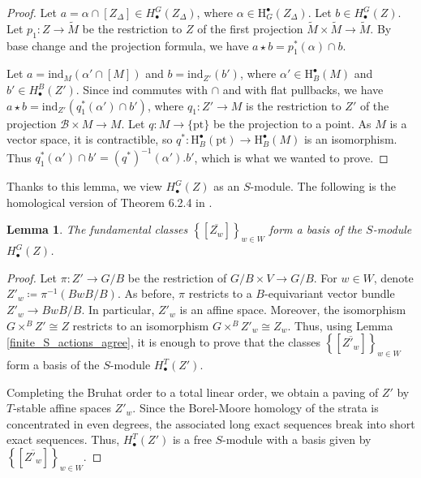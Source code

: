\documentclass[11pt]{article}
\newcommand{\B}{\mathcal{B}}
\newcommand{\1}{\mathbb{1}}
\newcommand{\HBM}[2]{H_\bullet^{#1}(#2)}
\newcommand{\tM}{\widetilde{M}}
\newcommand{\pt}{\text{pt}}
\newtheorem{lemma}[theorem]{Lemma}
\theoremstyle{definition}
\numberwithin{equation}{section}
\begin{document}
\begin{proof}
    Let $a = \alpha \cap[Z_\Delta] \in \HBM{G}{Z_\Delta}$, where $\alpha\in \text{H}^\bullet_G(Z_\Delta)$. Let $b\in \HBM{G}{Z}$. 
    Let $p_1:Z\rightarrow \tM$ be the restriction to $Z$ of the first projection $\tM\times\tM \rightarrow \tM$. By base change and the projection formula, we have $a\star b = p_1^*(\alpha) \cap b$.

    Let $a=\text{ind}_M(\alpha'\cap [M])$ and $b=\text{ind}_{Z'}(b')$, where $\alpha'\in \text{H}^\bullet_B(M)$ and $b'\in \HBM{B}{Z'}$. Since $\text{ind}$ commutes with $\cap$ and with flat pullbacks, we have $a\star b = \text{ind}_{Z'}(q_1^* (\alpha') \cap b')$, where $q_1 : Z' \rightarrow M$ is the restriction to $Z'$ of the projection $\B\times M \rightarrow M$. Let $q:M\rightarrow \{\pt\}$ be the projection to a point. As $M$ is a vector space, it is contractible, so $q^* : \text{H}^\bullet_{B}({\pt}) \rightarrow \text{H}^\bullet_B(M)$ is an isomorphism. Thus $q_1^*(\alpha') \cap b' = (q^*)^{-1}(\alpha') . b'$, which is what we wanted to prove.
\end{proof}

Thanks to this lemma, we view $\HBM{G}{Z}$ as an $S$-module. The following is the homological version of Theorem 6.2.4 in \cite{CG}.

\begin{lemma}
\label{finite_S_mod_basis}
    The fundamental classes $\left\{\left[\overline{Z_w}\right]\right\}_{w\in W}$ form a basis of the $S$-module $\HBM{G}{Z}$.
\end{lemma}

\begin{proof}
    Let $\pi:Z' \rightarrow G/B$ be the restriction of $G/B \times V \rightarrow G/B$. For $w\in W$, denote $Z'_w \coloneqq \pi^{-1}(BwB/B)$. As before, $\pi$ restricts to a $B$-equivariant vector bundle $Z'_w \rightarrow BwB/B$. In particular, $Z'_w$ is an affine space. Moreover, the isomorphism $G\times^BZ' \cong Z$ restricts to an isomorphism $G\times^B Z'_w \cong Z_w$. Thus, using Lemma \ref{finite_S_actions_agree}, it is enough to prove that the classes $\left\{\left[\overline{Z'_w}\right]\right\}_{w\in W}$ form a basis of the $S$-module $\HBM{T}{Z'}$.

    Completing the Bruhat order to a total linear order, we obtain a paving of $Z'$ by $T$-stable affine spaces $Z'_w$. Since the Borel-Moore homology of the strata is concentrated in even degrees, the associated long exact sequences break into short exact sequences. Thus, $\HBM{T}{Z'}$ is a free $S$-module with a basis given by $\left\{\left[\overline{Z'_w}\right]\right\}_{w\in W}$.
\end{proof}
\end{document}
